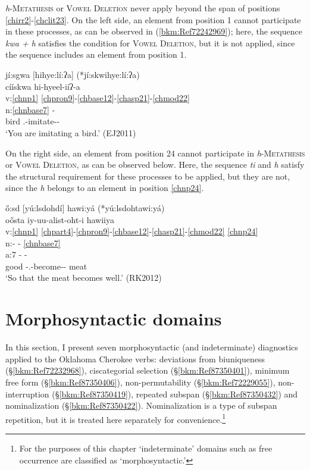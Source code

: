 \documentclass[output=paper]{langscibook}
\begin{document}
\textit{h}{}-\textsc{Metathesis} or \textsc{Vowel} \textsc{Deletion} never apply beyond the span of positions \ref{chirr2}-\ref{chclit23}. On the left side, an element from position 1 cannot participate in these processes, as can be observed in (\ref{bkm:Ref72242969}); here, the sequence \textit{kwa + h} satisfies the condition for \textsc{Vowel} \textsc{Deletion}, but it is not applied, since the sequence includes an element from position 1. 

\ea\label{bkm:Ref72242969}jí:sgwa [hihye:lí:ʔa] (*jí:skwihye:lí:ʔa) \\
\gllll cíískwa  hi-hyeel-iíʔ-a\\
v:\ref{chnp1} \ref{chpron9}-\ref{chbase12}-\ref{chasp21}-\ref{chmod22}\\
n:\ref{chnbase7} -\\ 
bird \Second\Sg.\Aarg{}-imitate-\Prs{}-\Ind{}\\
\glt `You are imitating a bird.' (EJ2011)
\z 

On the right side, an element from position 24 cannot participate in \textit{h}{}-\textsc{Metath\-e\-sis} or \textsc{Vowel} \textsc{Deletion}, as can be observed below. Here, the sequence \textit{ti} and \textit{h} satisfy the structural requirement for these processes to be applied, but they are not, since the \textit{h} belongs to an element in position \ref{chnp24}.

\ea\label{ex:cher:key:53} { \H{o}:sd [yú:lsdohdí] hawi:yá  (*yú:lsdohtawi:yá)} \\
\glllll oősta iy-uu-alist-oht-i hawiiya \\
v:\ref{chnp1}  \ref{chpart4}-\ref{chpron9}-\ref{chbase12}-\ref{chasp21}-\ref{chmod22} \ref{chnp24}\\
n:- - \ref{chnbase7}\\ 
a:7 - - \\ 
good \Part{}-\Third\Sg.\Barg{}-become-\Inf{}-\Nom{} meat\\
\glt `So that the meat becomes well.' (RK2012)
\z 


\section{Morphosyntactic domains}
\label{bkm:Ref87352909}
In this section, I present seven morphosyntactic (and indeterminate) diagnostics applied to the Oklahoma Cherokee verbs: deviations from biuniqueness (§\ref{bkm:Ref72232968}), ciscategorial selection (§\ref{bkm:Ref87350401}), minimum free form (§\ref{bkm:Ref87350406}), non-permutability (§\ref{bkm:Ref72229055}), non-interruption (§\ref{bkm:Ref87350419}), repeated subspan (§\ref{bkm:Ref87350432}) and nominalization (§\ref{bkm:Ref87350422}). Nominalization is a type of subspan repetition, but it is treated here separately for convenience.\footnote{For the purposes of this chapter `indeterminate' domains such as free occurrence are classified as `morphosyntactic.'}
\end{document}
